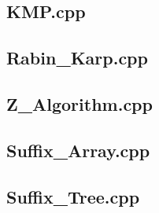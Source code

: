 \subsection{KMP.cpp}

\subsection{Rabin\_Karp.cpp}

\subsection{Z\_Algorithm.cpp}

\subsection{Suffix\_Array.cpp}

\subsection{Suffix\_Tree.cpp}

